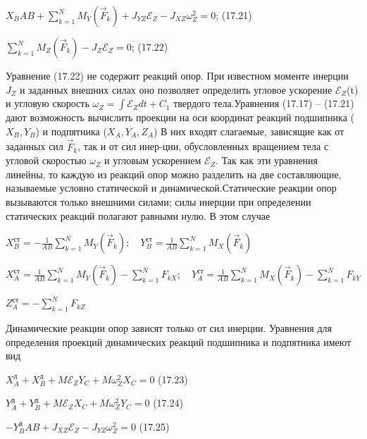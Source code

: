 {\begin{center}
    \par $X_BAB+ \sum\limits_{k=1}^N M_Y(\Vec{F}_k)+ J_{YZ}\mathcal{E}_Z-J_{XZ}\omega_Z^2=0$; \qquad (17.21)
    
    \par $\sum\limits_{k=1}^N M_Z(\Vec{F}_k)- J_{Z}\mathcal{E}_Z=0$; \qquad (17.22)

    \par Уравнение  (17.22)  не  содержит  реакций  опор.  При  известном  моменте инерции $J_Z$  и  заданных  внешних  силах  оно  позволяет  определить  угловое ускорение $\mathcal{E}_Z$(t) и угловую скорость  $\omega_Z=\int \mathcal{E}_Z dt+C_1$ твердого тела.Уравнения  (17.17)  –  (17.21)  дают возможность вычислить  проекции  на оси координат реакций подшипника  ($X_B , Y_B $) и подпятника  ($X_A,Y_A,Z_A $) В них входят слагаемые, зависящие как от заданных сил $\Vec{F}_k $, так и от сил инер-ции,  обусловленных  вращением  тела  с  угловой  скоростью $\omega_Z$  и  угловым ускорением $\mathcal{E}_Z$. Так как эти уравнения линейны, то каждую из реакций опор можно разделить на две составляющие,  называемые условно статической и динамической.Статические реакции опор вызываются только внешними силами; силы инерции при определении статических реакций полагают равными нулю. В этом случае

    \par $ X_B^{\text{ст}}=-\frac{1}{AB} \sum\limits_{k=1}^N M_Y(\Vec{F}_k); \quad Y_B^{\text{ст}}=\frac{1}{AB} \sum\limits_{k=1}^N M_X(\Vec{F}_k) $

    \par  $ X_A^{\text{ст}}=\frac{1}{AB} \sum\limits_{k=1}^N M_Y(\Vec{F}_k)- \sum\limits_{k=1}^NF_{kX}; \quad Y_A^{\text{ст}}=\frac{1}{AB} \sum\limits_{k=1}^N M_X(\Vec{F}_k) - \sum\limits_{k=1}^NF_{kY} $

    \par $Z_A^{\text{ст}}=- \sum\limits_{k=1}^NF_{kZ}$

    \par Динамические реакции опор зависят только от сил инерции. Уравнения для определения проекций динамических реакций подшипника и подпятника имеют вид

    \par $X_A^{\text{д}}+X_B^{\text{д}} + M \mathcal{E}_Z Y_C + M\omega_Z^2X_C=0$ \qquad (17.23)

    \par $Y_A^{\text{д}}+Y_B^{\text{д}} + M \mathcal{E}_Z X_C + M\omega_Z^2Y_C=0$ \qquad (17.24)

    \par $ -Y_B^{\text{д}}AB + J_{XZ}\mathcal{E}_Z - J_{YZ}\omega_Z^2=0$ \qquad (17.25)


\end{center}}
